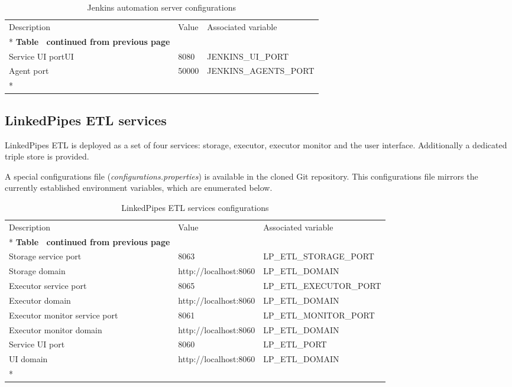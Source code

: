 	\begin{longtable}[c]{@{}p{4cm}p{5cm}l@{}}
		\toprule
		Description & Value & Associated variable \\* \midrule
		\endfirsthead
		\multicolumn{3}{c}%
		{{\bfseries Table \thetable\ continued from previous page}} \\
		\endhead
		Service UI portUI & 8080 & JENKINS\_UI\_PORT \\
		Agent port & 50000 & JENKINS\_AGENTS\_PORT \\* \bottomrule
		\caption{Jenkins automation server configurations}
		\label{tab:my-table4}\\
	\end{longtable}
	
	\subsection{LinkedPipes ETL services}
	
	LinkedPipes ETL is deployed as a set of four services: storage, executor, executor monitor and the user interface. Additionally a dedicated triple store is provided. 
	
	A special configurations file (\textit{configurations.properties}) is available in the cloned Git repository. This configurations file mirrors the currently established environment variables, which are enumerated below. 
	

	\begin{longtable}[c]{@{}p{5cm}p{4cm}l@{}}
		\toprule
		Description & Value & Associated variable \\* \midrule
		\endfirsthead
		\multicolumn{3}{c}%
		{{\bfseries Table \thetable\ continued from previous page}} \\
		\endhead
		\bottomrule
		\endfoot
		\endlastfoot
		Storage service port & 8063 & LP\_ETL\_STORAGE\_PORT \\
		Storage domain & http://localhost:8060 & LP\_ETL\_DOMAIN \\
		Executor service port & 8065 & LP\_ETL\_EXECUTOR\_PORT \\
		Executor domain & http://localhost:8060 & LP\_ETL\_DOMAIN \\
		Executor monitor service port & 8061 & LP\_ETL\_MONITOR\_PORT \\
		Executor monitor domain & http://localhost:8060 & LP\_ETL\_DOMAIN \\
		Service UI port & 8060 & LP\_ETL\_PORT \\
		UI domain & http://localhost:8060 & LP\_ETL\_DOMAIN \\* \bottomrule
		\caption{LinkedPipes ETL services configurations}
		\label{tab:my-table5}\\
	\end{longtable}
	
